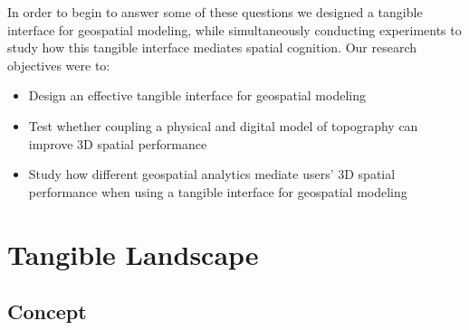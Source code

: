 \documentclass[prodmode,acmtochi]{acmsmall} %
\begin{document}
In order to begin to answer some of these questions we 
designed a tangible interface for geospatial modeling, 
while simultaneously conducting experiments
to study how this tangible interface mediates spatial cognition.
%
Our research objectives were to:
%
\begin{itemize}
\item Design an effective tangible interface for geospatial modeling
\item Test whether coupling a physical and digital model of topography can improve 3D spatial performance
\item Study how different geospatial analytics mediate users' 3D spatial performance when using a tangible interface for geospatial modeling
\end{itemize}


\section{Tangible Landscape}

\subsection{Concept}

% 
%
% 

\end{document}
